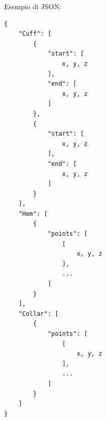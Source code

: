 \documentclass[11pt]{report}
\begin{document}
\newpage
Esempio di JSON:
\begin{verbatim}
{
    "Cuff": [
        {
            "start": [
                x, y, z
            ],
            "end": [
                x, y, z
            ]
        },
        {
            "start": [
                x, y, z
            ],
            "end": [
                x, y, z
            ]
        }
    ],
    "Hem": [
        {
            "points": [
                [
                    x, y, z
                ],
                ...
            ]
        }
    ],
    "Collar": [
        {
            "points": [
                [
                    x, y, z
                ],
                ...
            ]
        }
    ]
}
\end{verbatim}











\listoffigures
\end{document}
